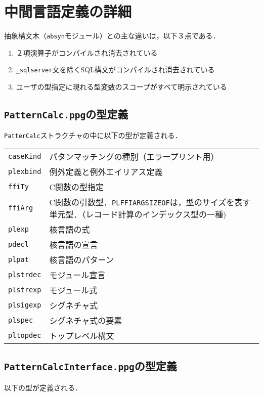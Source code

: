 \documentclass{jbook}
\newif\ifjp
\newcommand{\txt}[2]{#1}
\newcommand{\code}[1]{\mbox{\large\tt #1}}
\begin{document}
\section{\txt{中間言語定義の詳細}{The details of the language definitions}}
\ifjp%
	抽象構文木（\code{absyn}モジュール）との主な違いは，以下３点である．
\begin{enumerate}
\item ２項演算子がコンパイルされ消去されている
\item \code{\_sqlserver}文を除くSQL構文がコンパイルされ消去されている
\item ユーザの型指定に現れる型変数のスコープがすべて明示されている
\end{enumerate}

\subsection{\code{PatternCalc.ppg}の型定義}
	\code{PatterCalc}ストラクチャの中に以下の型が定義される．

\begin{tabular}{ll}
\code{caseKind} & パタンマッチングの種別（エラープリント用）
\\
\code{plexbind} & 例外定義と例外エイリアス定義
\\
\code{ffiTy} & C関数の型指定
\\
\code{ffiArg} & C関数の引数型．\code{PLFFIARGSIZEOF}は，型のサイズを表す
単元型．（レコード計算のインデックス型の一種)
\\
\code{plexp} & 核言語の式
\\
\code{pdecl} & 核言語の宣言
\\
\code{plpat} & 核言語のパターン
\\
\code{plstrdec} & モジュール宣言
\\
\code{plstrexp} & モジュール式
\\
\code{plsigexp} & シグネチャ式
\\
\code{plspec} & シグネチャ式の要素
\\
\code{pltopdec} & トップレベル構文
\end{tabular}

\subsection{\code{PatternCalcInterface.ppg}の型定義}
	以下の型が定義される．
\end{document}
